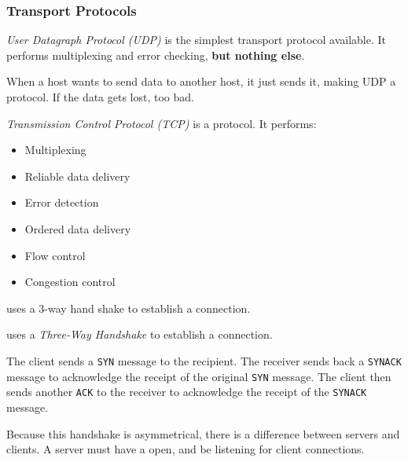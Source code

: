 \subsubsection{Transport Protocols}\label{subsubsec:Transport_Protocols}
\begin{definition}\label{def:User_Datagram_Protocol}
  \emph{User Datagraph Protocol (UDP)} is the simplest transport protocol available.
  It performs multiplexing and error checking, \textbf{but nothing else}.

  When a host wants to send data to another host, it just sends it, making UDP a  protocol.
  If the data gets lost, too bad.
\end{definition}

\begin{definition}\label{def:Transmission_Control_Protocol}
  \emph{Transmission Control Protocol (TCP)} is a  protocol.
  It performs:
  \begin{itemize}[noitemsep]
  \item Multiplexing
  \item Reliable data delivery
  \item Error detection
  \item Ordered data delivery
  \item Flow control
  \item Congestion control
  \end{itemize}
\end{definition}

 uses a 3-way hand shake to establish a connection.
\begin{definition}\label{def:TCP_3_Way_Handshake}
   uses a \emph{Three-Way Handshake} to establish a connection.

  The client sends a \texttt{SYN} message to the recipient.
  The receiver sends back a \texttt{SYN\textunderscore{}ACK} message to acknowledge the receipt of the original \texttt{SYN} message.
  The client then sends another \texttt{ACK} to the receiver to acknowledge the receipt of the \texttt{SYN\textunderscore{}ACK} message.

  Because this handshake is asymmetrical, there is a difference between servers and clients.
  A server must have a  open, and be listening for client connections.
\end{definition}

